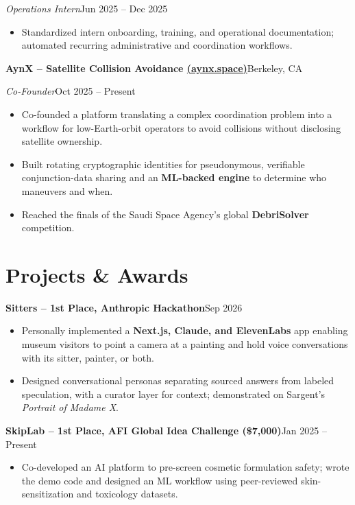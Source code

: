 \documentclass[a4paper,10pt]{article}
\newcommand{\entry}[4]{%
  \textbf{#1}\hfill #2\par
  \textit{#3}\hfill #4\par
}
\newcommand{\project}[2]{\textbf{#1}\hfill #2\par}
\begin{document}
\textit{Operations Intern}\hfill Jun 2025 -- Dec 2025\par
\begin{itemize}
  \item Standardized intern onboarding, training, and operational
  documentation; automated recurring administrative and coordination
  workflows.
\end{itemize}

\entry
{AynX -- Satellite Collision Avoidance
  \;\href{https://aynx.space}{(aynx.space)}}
{Berkeley, CA}
{Co-Founder}
{Oct 2025 -- Present}
\begin{itemize}
  \item Co-founded a platform translating a complex coordination
  problem into a workflow for low-Earth-orbit operators to avoid
  collisions without disclosing satellite ownership.
  \item Built rotating cryptographic identities for pseudonymous,
  verifiable conjunction-data sharing and an \textbf{ML-backed engine}
  to determine who maneuvers and when.
  \item Reached the finals of the Saudi Space Agency's global
  \textbf{DebriSolver} competition.
\end{itemize}

\section{Projects \& Awards}

\project{Sitters -- 1st Place, Anthropic Hackathon}{Sep 2026}
\begin{itemize}
  \item Personally implemented a \textbf{Next.js, Claude, and ElevenLabs}
  app enabling museum visitors to point a camera at a painting and
  hold voice conversations with its sitter, painter, or both.
  \item Designed conversational personas separating sourced answers
  from labeled speculation, with a curator layer for context;
  demonstrated on Sargent's \textit{Portrait of Madame X}.
\end{itemize}

\project
{SkipLab -- 1st Place, AFI Global Idea Challenge (\$7,000)}
{Jan 2025 -- Present}
\begin{itemize}
  \item Co-developed an AI platform to pre-screen cosmetic formulation
  safety; wrote the demo code and designed an ML workflow using
  peer-reviewed skin-sensitization and toxicology datasets.
\end{itemize}
\end{document}
